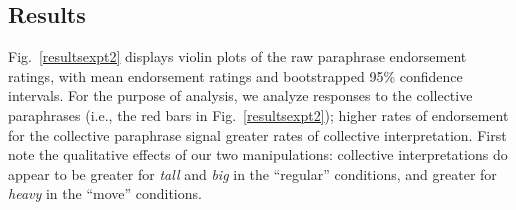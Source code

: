 \documentclass[preprint,12pt,authoryear,titlepage]{elsarticle}
\newcommand{\ndg}[1]{\textcolor{Green}{[ndg: #1]}}
\begin{document}
%
%
%

\subsection{Results}

Fig.\ \ref{resultsexpt2} displays violin plots of the raw paraphrase endorsement ratings, with mean endorsement ratings and bootstrapped 95\% confidence intervals. For the purpose of analysis, we analyze responses to the collective paraphrases (i.e., the red bars in Fig.~\ref{resultsexpt2}); higher rates of endorsement for the collective paraphrase signal greater rates of collective interpretation. %
First note the qualitative effects of our two manipulations: collective interpretations do appear to be greater for \emph{tall} and \emph{big} in the ``regular'' conditions, and greater for \emph{heavy} in the ``move'' conditions.
\end{document}
